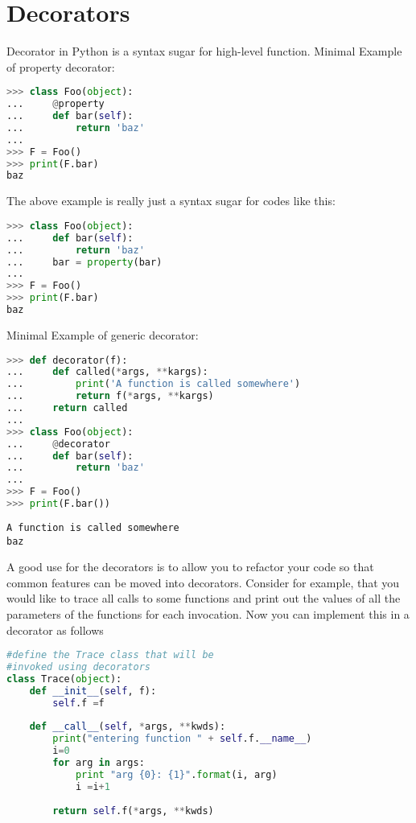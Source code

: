 \section{Decorators}
Decorator in Python is a syntax sugar for high-level function.  Minimal Example
of property decorator:
\lstset{basicstyle=\scriptsize, numbers=left, captionpos=b, tabsize=4}
\begin{lstlisting}[caption=Minimal Example,language={Python},
xleftmargin=15pt, label=lst:minimalexample]
>>> class Foo(object):
...     @property
...     def bar(self):
...         return 'baz'
...
>>> F = Foo()
>>> print(F.bar)
baz
\end{lstlisting}

The above example is really just a syntax sugar for codes like this:
\lstset{basicstyle=\scriptsize, numbers=left, captionpos=b, tabsize=4}
\begin{lstlisting}[caption=Different Style,language={Python},
xleftmargin=15pt, label=lst:differentstyle]
>>> class Foo(object):
...     def bar(self):
...         return 'baz'
...     bar = property(bar)
...
>>> F = Foo()
>>> print(F.bar)
baz
\end{lstlisting}

Minimal Example of generic decorator:
\lstset{basicstyle=\scriptsize, numbers=left, captionpos=b, tabsize=4}
\begin{lstlisting}[caption=Generic Decorator,language={Python},
xleftmargin=15pt, label=lst:genericdecorator]
>>> def decorator(f):
...     def called(*args, **kargs):
...         print('A function is called somewhere')
...         return f(*args, **kargs)
...     return called
...
>>> class Foo(object):
...     @decorator
...     def bar(self):
...         return 'baz'
...
>>> F = Foo()
>>> print(F.bar())
\end{lstlisting}

\scriptsize
\begin{verbatim}
A function is called somewhere
baz
\end{verbatim}
\normalsize
A good use for the decorators is to allow you to refactor your code so that
common features can be moved into decorators. Consider for example, that you
would like to trace all calls to some functions and print out the values of all
the parameters of the functions for each invocation. Now you can implement this
in a decorator as follows
\lstset{basicstyle=\scriptsize, numbers=left, captionpos=b, tabsize=4}
\begin{lstlisting}[caption=Refactoring,language={Python},
xleftmargin=15pt, label=lst:refactoring]
#define the Trace class that will be 
#invoked using decorators
class Trace(object):
    def __init__(self, f):
        self.f =f
 
    def __call__(self, *args, **kwds):
        print("entering function " + self.f.__name__)
        i=0
        for arg in args:
            print "arg {0}: {1}".format(i, arg)
            i =i+1
 
        return self.f(*args, **kwds)
\end{lstlisting}


